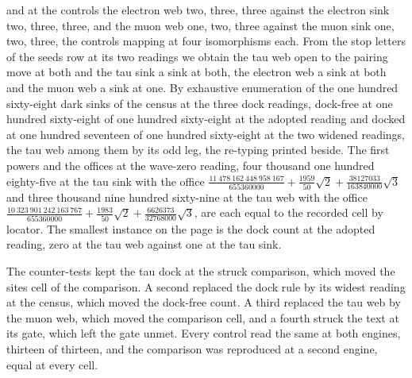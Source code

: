 \begin{chproof}
\begin{equation}
\end{equation}
and at the controls the electron web two, three, three against the electron sink two, three, three, and the muon web one, two, three against the muon sink one, two, three, the controls mapping at four isomorphisms each. From the stop letters of the seeds row at its two readings we obtain the tau web open to the pairing move at both and the tau sink a sink at both, the electron web a sink at both and the muon web a sink at one. By exhaustive enumeration of the one hundred sixty-eight dark sinks of the census at the three dock readings, dock-free at one hundred sixty-eight of one hundred sixty-eight at the adopted reading and docked at one hundred seventeen of one hundred sixty-eight at the two widened readings, the tau web among them by its odd leg, the re-typing printed beside. The first powers and the offices at the wave-zero reading, four thousand one hundred eighty-five at the tau sink with the office $\tfrac{11\ 478\ 162\ 448\ 958\ 167}{655360000} + \tfrac{1959}{50}\sqrt{2} + \tfrac{38127033}{163840000}\sqrt{3}$ and three thousand nine hundred sixty-nine at the tau web with the office $\tfrac{10\ 323\ 901\ 242\ 163\ 767}{655360000} + \tfrac{1983}{50}\sqrt{2} + \tfrac{6626373}{32768000}\sqrt{3}$, are each equal to the recorded cell by locator. The smallest instance on the page is the dock count at the adopted reading, zero at the tau web against one at the tau sink.

The counter-tests kept the tau dock at the struck comparison, which moved the sites cell of the comparison. A second replaced the dock rule by its widest reading at the census, which moved the dock-free count. A third replaced the tau web by the muon web, which moved the comparison cell, and a fourth struck the text at its gate, which left the gate unmet. Every control read the same at both engines, thirteen of thirteen, and the comparison was reproduced at a second engine, equal at every cell.
\end{chproof}
